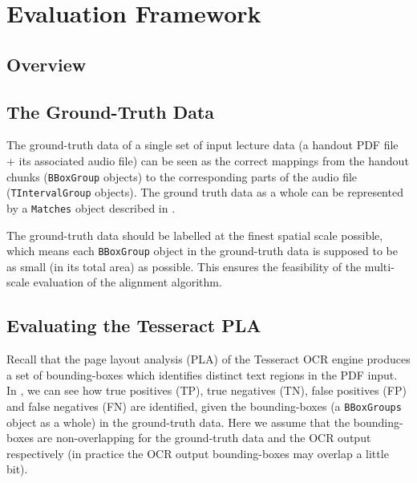 
\chapter{Evaluation Framework}

\ifpdf
    \graphicspath{{Chapter7/Figs/Raster/}{Chapter7/Figs/PDF/}{Chapter7/Figs/}}
\else
    \graphicspath{{Chapter7/Figs/Vector/}{Chapter7/Figs/}}
\fi


\section{Overview}

\section{The Ground-Truth Data}

The ground-truth data of a single set of input lecture data (a handout PDF file + its associated audio file) can be seen as the correct mappings from the handout chunks (\texttt{BBoxGroup} objects) to the corresponding parts of the audio file (\texttt{TIntervalGroup} objects). The ground truth data as a whole can be represented by a \texttt{Matches} object described in .

The ground-truth data should be labelled at the finest spatial scale possible, which means each \texttt{BBoxGroup} object in the ground-truth data is supposed to be as small (in its total area) as possible. This ensures the feasibility of the multi-scale evaluation of the alignment algorithm.

\section{Evaluating the Tesseract PLA}

Recall that the page layout analysis (PLA) of the Tesseract OCR engine produces a set of bounding-boxes which identifies distinct text regions in the PDF input. In , we can see how true positives (TP), true negatives (TN), false positives (FP) and false negatives (FN) are identified, given the bounding-boxes (a \texttt{BBoxGroups} object as a whole) in the ground-truth data. Here we assume that the bounding-boxes are non-overlapping for the ground-truth data and the OCR output respectively (in practice the OCR output bounding-boxes may overlap a little bit).

